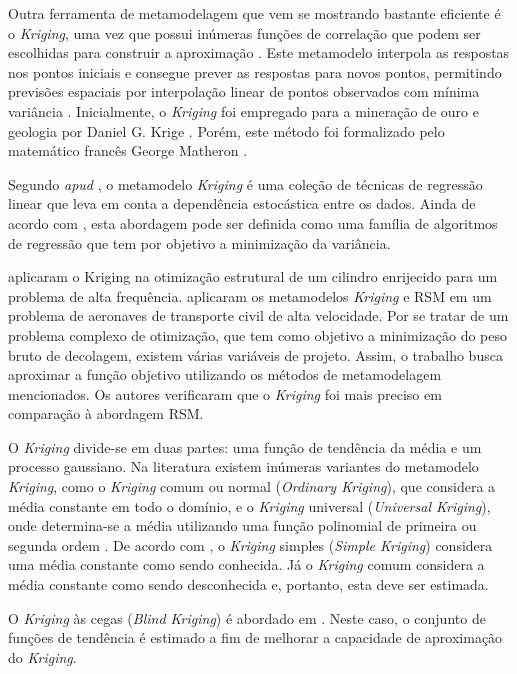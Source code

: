 Outra ferramenta de metamodelagem que vem se mostrando bastante eficiente é o {\it Kriging}, uma vez que possui inúmeras funções de correlação que podem ser escolhidas para construir a aproximação \cite{Simpson2001}. Este metamodelo interpola as respostas nos pontos iniciais e consegue prever as respostas para novos pontos, permitindo previsões espaciais por interpolação linear de pontos observados com mínima variância \cite{CARVALHO2017}. Inicialmente, o {\it Kriging} foi empregado para a mineração de ouro e geologia por Daniel G. Krige \cite{Krige1951}. Porém, este método foi formalizado pelo matemático francês George Matheron \cite{Matheron1963}. 

Segundo  {\it apud} , o metamodelo {\it Kriging} é uma coleção de técnicas de regressão linear que leva em conta a dependência estocástica entre os dados. Ainda de acordo com , esta abordagem pode ser definida como uma família de algoritmos de regressão que tem por objetivo a minimização da variância. 

 aplicaram o Kriging na otimização estrutural de um cilindro enrijecido para um problema de alta frequência.  aplicaram os metamodelos {\it Kriging} e RSM em um problema de aeronaves de transporte civil de alta velocidade. Por se tratar de um problema complexo de otimização, que tem como objetivo a minimização do peso bruto de decolagem, existem várias variáveis de projeto. Assim, o trabalho busca aproximar a função objetivo utilizando os métodos de metamodelagem mencionados. Os autores verificaram que o {\it Kriging} foi mais preciso em comparação {\color{red} à} abordagem RSM. 

O {\it Kriging} divide-se em duas partes: uma função de tendência da média e um processo gaussiano. Na literatura existem inúmeras variantes do metamodelo {\it Kriging}, como o {\it Kriging} comum ou normal (\textit{Ordinary Kriging}), que considera a média constante em todo o domínio, e o {\it Kriging} universal (\textit{Universal Kriging}), onde determina-se a média utilizando uma função polinomial de primeira ou segunda ordem  {\color{red}\cite{lataniotis2015uqlab}}. De acordo com , o {\it Kriging} simples (\textit{Simple Kriging}) considera uma média constante como sendo conhecida. Já o {\it Kriging} comum considera a média constante como sendo desconhecida e, portanto, esta deve ser estimada. 

O {\it Kriging} às cegas (\textit{Blind Kriging}) é abordado em . Neste caso, o conjunto de funções de tendência é estimado a fim de melhorar a capacidade de aproximação do {\it Kriging}. 


